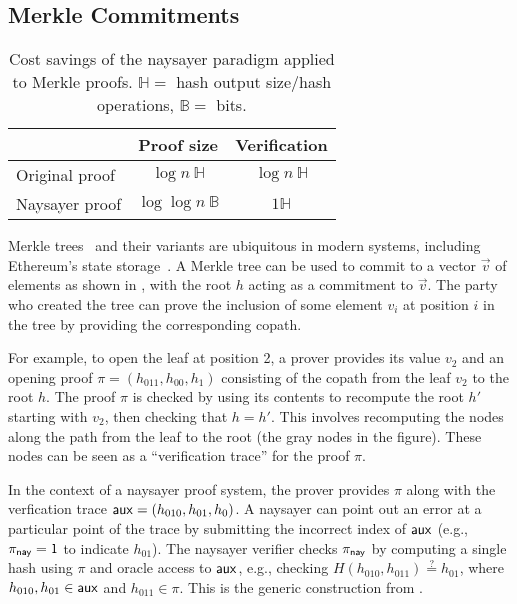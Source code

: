 \subsection{Merkle Commitments}\label{sec:merkle_naysayer}
\begin{table}[h]
   \centering
    \setlength{\belowbottomsep}{6pt}
    \begin{tabular}{l c c} 
    \toprule
     & \textbf{Proof size}
     & \textbf{Verification}
     \\ \midrule
     Original proof
     & $\log{n}\ \mathbb{H}$
     & $\log{n}\ \mathbb{H}$
     \\\midrule
     Naysayer proof
     & $\log\log{n}\ \mathbb{B}$
     & $1\mathbb{H}$
    \\ \bottomrule
    \end{tabular}
    \caption{Cost savings of the naysayer paradigm applied to Merkle proofs. $\mathbb{H} =$ hash output size/hash operations, $\mathbb{B} =$ bits.}
    \label{tab:merkle_asym}
   \end{table}



Merkle trees~\cite{C:Merkle87} and their variants are ubiquitous in modern systems, including Ethereum's state storage~\cite{ethereum_trie}. A Merkle tree can be used to commit to a vector $\vec{v}$ of elements as shown in , with the root $h$ acting as a commitment to $\vec{v}$. The party who created the tree can prove the inclusion of some element $v_i$ at position $i$ in the tree by providing the corresponding copath. 

For example, to open the leaf at position 2, a prover provides its value $v_2$ and an opening proof $\pi = (h_{011}, h_{00}, h_{1})$ consisting of the copath from the leaf $v_2$ to the root $h$. The proof $\pi$ is checked by using its contents to recompute the root $h'$ starting with $v_2$, then checking that $h = h'$. This involves recomputing the nodes along the path from the leaf to the root (the gray nodes in the figure). These nodes can be seen as a ``verification trace'' for the proof $\pi$.
    
In the context of a naysayer proof system, the prover provides $\pi$ along with the verfication trace $\mathsf{aux} = (h_{010}, h_{01}, h_{0})$. A naysayer can point out an error at a particular point of the trace by submitting the incorrect index of $\mathsf{aux}$ (e.g., $\pi_{\mathsf{nay}} = 1$ to indicate $h_{01}$). The naysayer verifier checks $\pi_{\mathsf{nay}}$ by computing a single hash using $\pi$ and oracle access to $\mathsf{aux}$, e.g., checking $H(h_{010}, h_{011}) \stackrel{?}{=} h_{01}$, where $h_{010}, h_{01} \in \mathsf{aux}$ and $h_{011} \in \pi$. This is the generic construction from .

